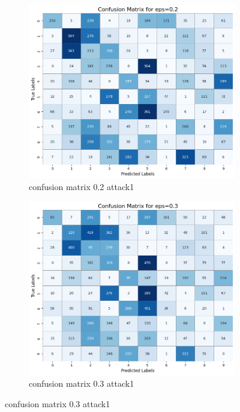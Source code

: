 \documentclass[11pt,onside]{article}
\begin{document}
\begin{figure}[h]
  \centering
  \begin{subfigure}[b]{0.49\textwidth}
    \centering
    \includegraphics[width=\textwidth]{V2_images/confusion_matrix_eps_0.2_attack_1.png}
    \caption{confusion matrix 0.2 attack1}
    \label{fig:image1}
  \end{subfigure}
  \hfill
  \begin{subfigure}[b]{0.49\textwidth}
    \centering
    \includegraphics[width=\textwidth]{V2_images/confusion_matrix_eps_0.3_attack_1.png}
    \caption{confusion matrix 0.3 attack1}
    \label{fig:image2}
  \end{subfigure}
  \label{fig:images}
\end{figure}
\end{document}
